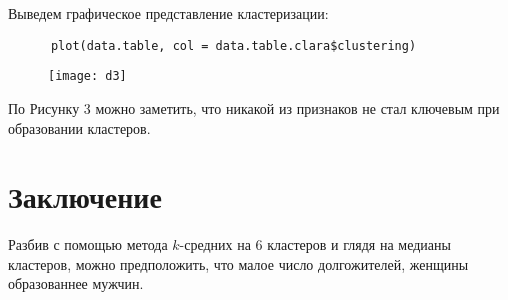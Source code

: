 \documentclass[12pt,a4paper,titlepage]{article}
\begin{document}
    Выведем графическое представление кластеризации:
    \begin{lstlisting}
      plot(data.table, col = data.table.clara$clustering)
    \end{lstlisting}

    \begin{figure}
      \texttt{[image: d3]}
      \label{fig:dend3}
    \end{figure}

    По Рисунку 3 можно заметить, что никакой из признаков не стал ключевым при образовании кластеров.

\section{Заключение}
  Разбив с помощью метода $k$-средних на 6 кластеров и глядя на медианы кластеров, можно предположить, что малое число долгожителей, женщины образованнее мужчин.
\end{document}
